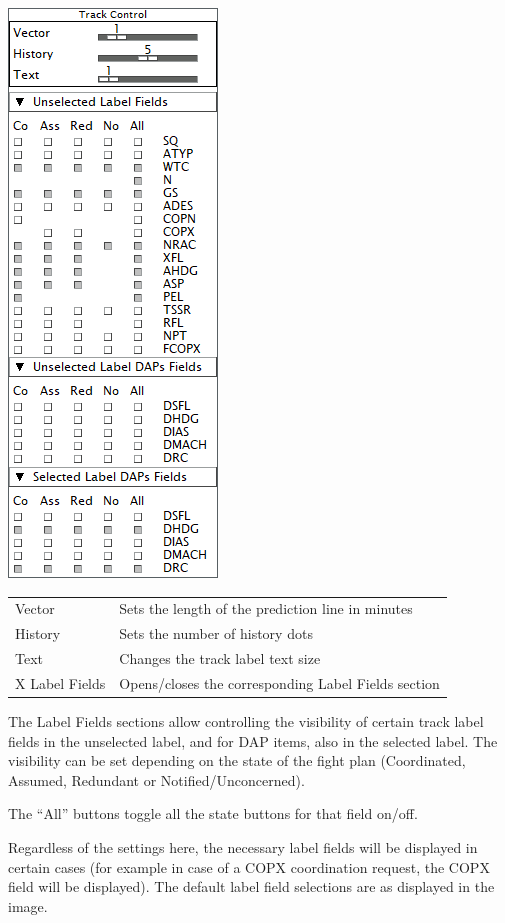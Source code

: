 \documentclass[11pt,a4paper,oldfontcommands]{memoir}
\begin{document}
\includegraphics{img/trackctl.png}

\begin{tabular}{l l}
    Vector          & Sets the length of the prediction line in minutes\\
    History         & Sets the number of history dots\\
    Text            & Changes the track label text size\\
    X Label Fields  & Opens/closes the corresponding Label Fields section\\
\end{tabular}

The Label Fields sections allow controlling the visibility of certain track label fields in the unselected label, and for DAP items, also in the selected label. The visibility can be set depending on the state of the fight plan (Coordinated, Assumed, Redundant or Notified/Unconcerned).

The “All” buttons toggle all the state buttons for that field on/off.

Regardless of the settings here, the necessary label fields will be displayed in certain cases (for example in case of a COPX coordination request, the COPX field will be displayed). The default label field selections are as displayed in the image.
\end{document}
